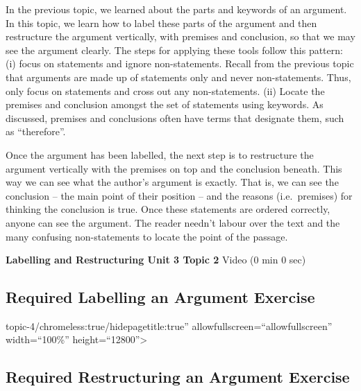 \documentclass[
]{book}
\begin{document}
In the previous topic, we learned about the parts and keywords of an argument. In this topic, we learn how to label these parts of the argument and then restructure the argument vertically, with premises and conclusion, so that we may see the argument clearly. The steps for applying these tools follow this pattern: (i) focus on statements and ignore non-statements. Recall from the previous topic that arguments are made up of statements only and never non-statements. Thus, only focus on statements and cross out any non-statements. (ii) Locate the premises and conclusion amongst the set of statements using keywords. As discussed, premises and conclusions often have terms that designate them, such as ``therefore''.

Once the argument has been labelled, the next step is to restructure the argument vertically with the premises on top and the conclusion beneath. This way we can see what the author's argument is exactly. That is, we can see the conclusion -- the main point of their position -- and the reasons (i.e.~premises) for thinking the conclusion is true. Once these statements are ordered correctly, anyone can see the argument. The reader needn't labour over the text and the many confusing non-statements to locate the point of the passage.

\textbf{Labelling and Restructuring Unit 3 Topic 2} Video (0 min 0 sec)

\hypertarget{required-labelling-an-argument-exercise}{%
\subsection*{Required Labelling an Argument Exercise}\label{required-labelling-an-argument-exercise}}

\begin{reflect}
topic-4/chromeless:true/hidepagetitle:true'' allowfullscreen=``allowfullscreen'' width=``100\%'' height=``12800''\textgreater{}
\end{reflect}

\hypertarget{required-restructuring-an-argument-exercise}{%
\subsection*{Required Restructuring an Argument Exercise}\label{required-restructuring-an-argument-exercise}}
\end{document}
